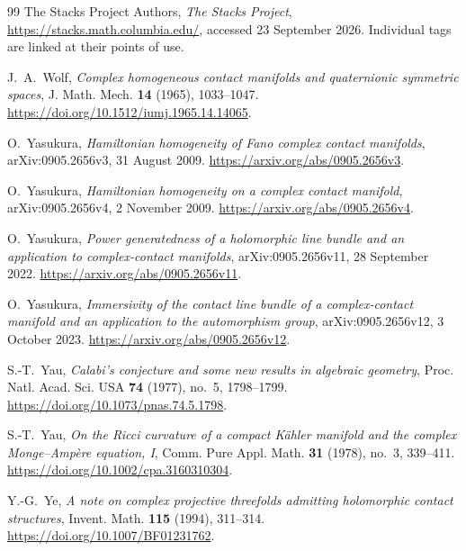 \begin{thebibliography}{99}
The Stacks Project Authors,
\emph{The Stacks Project},
\url{https://stacks.math.columbia.edu/}, accessed 23 September 2026.
Individual tags are linked at their points of use.

J.~A.~Wolf,
\emph{Complex homogeneous contact manifolds and quaternionic symmetric spaces},
J. Math. Mech. \textbf{14} (1965), 1033--1047.
\url{https://doi.org/10.1512/iumj.1965.14.14065}.

O.~Yasukura,
\emph{Hamiltonian homogeneity of Fano complex contact manifolds},
arXiv:0905.2656v3, 31 August 2009.
\url{https://arxiv.org/abs/0905.2656v3}.

O.~Yasukura,
\emph{Hamiltonian homogeneity on a complex contact manifold},
arXiv:0905.2656v4, 2 November 2009.
\url{https://arxiv.org/abs/0905.2656v4}.

O.~Yasukura,
\emph{Power generatedness of a holomorphic line bundle and an application
to complex-contact manifolds},
arXiv:0905.2656v11, 28 September 2022.
\url{https://arxiv.org/abs/0905.2656v11}.

O.~Yasukura,
\emph{Immersivity of the contact line bundle of a complex-contact manifold
and an application to the automorphism group},
arXiv:0905.2656v12, 3 October 2023.
\url{https://arxiv.org/abs/0905.2656v12}.

S.-T.~Yau,
\emph{Calabi's conjecture and some new results in algebraic geometry},
Proc. Natl. Acad. Sci. USA \textbf{74} (1977), no.~5, 1798--1799.
\url{https://doi.org/10.1073/pnas.74.5.1798}.

S.-T.~Yau,
\emph{On the Ricci curvature of a compact K\"ahler manifold and the
complex Monge--Amp\`ere equation, I},
Comm. Pure Appl. Math. \textbf{31} (1978), no.~3, 339--411.
\url{https://doi.org/10.1002/cpa.3160310304}.

Y.-G.~Ye,
\emph{A note on complex projective threefolds admitting holomorphic contact structures},
Invent. Math. \textbf{115} (1994), 311--314.
\url{https://doi.org/10.1007/BF01231762}.

\end{thebibliography}
\endgroup
